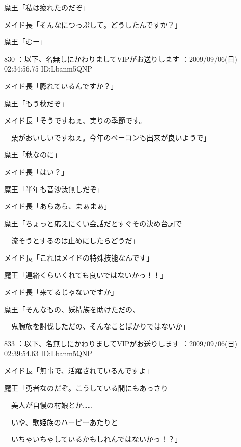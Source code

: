 \documentclass[a4j,twocolumn]{tarticle}
\begin{document}
魔王「私は疲れたのだぞ」\par{} 
メイド長「そんなにつっぷして。どうしたんですか？」 



魔王「むー」 

	
    
    

830 ：以下、名無しにかわりましてVIPがお送りします ：2009/09/06(日) 02:34:56.75 ID:Lbanm5QNP 


メイド長「膨れているんですか？」 



魔王「もう秋だぞ」 



メイド長「そうですねぇ、実りの季節です。\par{} 
　栗がおいしいですねぇ。今年のベーコンも出来が良いようで」 



魔王「秋なのに」\par{} 
メイド長「はい？」 



魔王「半年も音沙汰無しだぞ」\par{} 
メイド長「あらあら、まぁまぁ」 



魔王「ちょっと応えにくい会話だとすぐその決め台詞で\par{} 
　流そうとするのは止めにしたらどうだ」 



メイド長「これはメイドの特殊技能なんです」 



魔王「連絡くらいくれても良いではないかっ！！」\par{} 
メイド長「来てるじゃないですか」 



魔王「そんなもの、妖精族を助けただの、\par{} 
　鬼腕族を討伐しただの、そんなことばかりではないか」 

	
    
    

833 ：以下、名無しにかわりましてVIPがお送りします ：2009/09/06(日) 02:39:54.63 ID:Lbanm5QNP 


メイド長「無事で、活躍されているんですよ」 



魔王「勇者なのだぞ。こうしている間にもあっさり\par{} 
　美人が自慢の村娘とか……\par{} 
　いや、歌姫族のハーピーあたりと\par{} 
　いちゃいちゃしているかもしれんではないかっ！？」 
\end{document}
